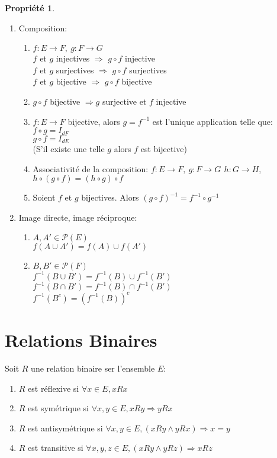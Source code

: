 \documentclass[fleqn]{article}
\theoremstyle{definition} \newtheorem*{defi}{D\'efinition}
\theoremstyle{definition} \newtheorem*{theo}{Th\'eor\`eme}
\theoremstyle{definition} \newtheorem*{coro}{Corollaire}
\theoremstyle{remark} \newtheorem*{rqs}{Remarques}
\theoremstyle{definition} \newtheorem*{prop}{Propri\'et\'e}
\begin{document}
\begin{prop} $ $
	\begin{enumerate}
		\item Composition:
			\begin{enumerate}
				\item \(f: E \rightarrow F,\ g: F \rightarrow G\) \\
					\(f\) et \(g\) injectives \(\Rightarrow\) \(g \circ f\) injective \\
					\(f\) et \(g\) surjectives \(\Rightarrow\) \(g \circ f\) surjectives \\
					\(f\) et \(g\) bijective \(\Rightarrow\) \(g \circ f\) bijective
				\item $g \circ f$ bijective $\Rightarrow g$ surjective et $f$ injective
				\item \(f: E \rightarrow F\) bijective, alors \(g = f^{-1}\) est l'unique application telle que: \\
					\(f \circ g = I_{dF}\) \\
					\(g \circ f = I_{dE}\) \\
					(S'il existe une telle $g$ alors $f$ est bijective)
				\item Associativit\'e de la composition: \(f: E \rightarrow F,\ g: F \rightarrow G\,\ h: G \rightarrow H\), \\
					\(h \circ (g \circ f) = (h \circ g) \circ f\)
				\item Soient $f$ et $g$ bijectives. Alors $(g\circ f)^{-1}  = f^{-1} \circ g^{-1}$
			\end{enumerate}
		\item Image directe, image r\'eciproque:
			\begin{enumerate}
				\item \(A, A' \in \mathcal{P}(E)\) \\
					\(f(A \cup A') = f(A) \cup f(A')\)
				\item \(B, B' \in \mathcal{P}(F)\) \\
					\(f^{-1}(B \cup B') = f^{-1}(B) \cup f^{-1}(B')\) \\
					\(f^{-1}(B \cap B') = f^{-1}(B) \cap f^{-1}(B')\) \\
					\(f^{-1}(B^c) = (f^{-1}(B))^c\)
			\end{enumerate}
	\end{enumerate}
\end{prop}

\section{Relations Binaires}
Soit \(R\) une relation binaire ser l'ensemble \(E\):
\begin{enumerate}
	\item \(R\) est r\'eflexive si \(\forall x \in E, xRx\)
	\item \(R\) est sym\'etrique si \(\forall x,y \in E, xRy \Rightarrow yRx\)
	\item \(R\) est antisym\'etrique si \(\forall x,y \in E, (xRy \land yRx) \Rightarrow x=y\)
	\item \(R\) est transitive si \(\forall x,y,z \in E, (xRy \land yRz) \Rightarrow xRz\)
\end{enumerate}
\end{document}
